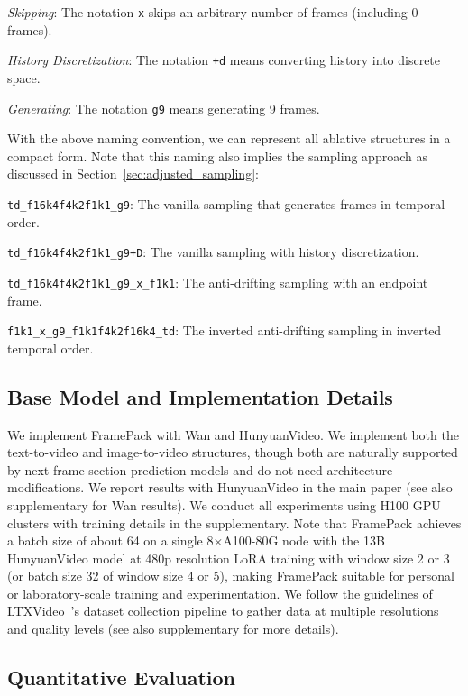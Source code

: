 \documentclass{article}
\begin{document}
\emph{Skipping}: The notation \texttt{x} skips an arbitrary number of frames (including 0 frames).

\emph{History Discretization}: The notation \texttt{+d} means converting history into discrete space.

\emph{Generating}: The notation \texttt{g9} means generating 9 frames.

With the above naming convention, we can represent all ablative structures in a compact form. Note that this naming also implies the sampling approach as discussed in Section~\ref{sec:adjusted_sampling}:

\texttt{td\_f16k4f4k2f1k1\_g9}: The vanilla sampling that generates frames in temporal order.

\texttt{td\_f16k4f4k2f1k1\_g9+D}: The vanilla sampling with history discretization.

\texttt{td\_f16k4f4k2f1k1\_g9\_x\_f1k1}: The anti-drifting sampling with an endpoint frame.

\texttt{f1k1\_x\_g9\_f1k1f4k2f16k4\_td}: The inverted anti-drifting sampling in inverted temporal order. 

\subsection{Base Model and Implementation Details}

We implement FramePack with Wan and HunyuanVideo. We implement both the text-to-video and image-to-video structures, though both are naturally supported by next-frame-section prediction models and do not need architecture modifications. We report results with HunyuanVideo in the main paper (see also supplementary for Wan results). We conduct all experiments using H100 GPU clusters with training details in the supplementary. Note that FramePack achieves a batch size of about 64 on a single 8×A100-80G node with the 13B HunyuanVideo model at 480p resolution LoRA training with window size 2 or 3 (or batch size 32 of window size 4 or 5), making FramePack suitable for personal or laboratory-scale training and experimentation. We follow the guidelines of LTXVideo~\cite{hacohen2024ltx}'s dataset collection pipeline to gather data at multiple resolutions and quality levels (see also supplementary for more details).

\subsection{Quantitative Evaluation}
\end{document}
